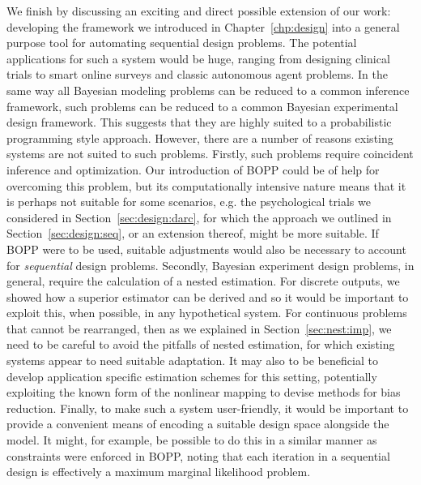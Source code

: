 We finish by discussing an exciting and direct possible extension of our work: developing the framework we introduced 
in Chapter~\ref{chp:design} into a general purpose tool for automating sequential design problems.
The potential applications for such a system would be huge,  ranging from designing clinical trials to
smart online surveys and classic autonomous agent problems.  In  the same way all Bayesian modeling
problems can be reduced to a common inference framework, such problems can be reduced to a
common Bayesian experimental design framework. This suggests that they are highly suited to a
probabilistic programming style approach.  However, there are a number of reasons existing systems
are not suited to such problems.  Firstly, such problems require coincident inference 
and optimization.  Our introduction of BOPP could be of help for overcoming this problem,
but its computationally intensive nature means that it is perhaps not suitable for
some scenarios, e.g. the psychological trials we considered in Section~\ref{sec:design:darc},
for which the approach we outlined in Section~\ref{sec:design:seq}, or an extension thereof,
might be more suitable.  If BOPP were to be used, suitable adjustments would also be necessary
to account for \emph{sequential} design problems.
Secondly, Bayesian experiment design problems, in general, require the calculation of a nested 
estimation.  For discrete outputs, we showed how a superior estimator can be derived and so
it would be important to exploit this, when possible, in any hypothetical system.  For continuous problems that
cannot be rearranged, then as we explained in Section~\ref{sec:nest:imp}, we need to be careful
to avoid the pitfalls of nested estimation, for which existing systems appear to need suitable
adaptation.  It may also to be beneficial to develop application specific estimation schemes
for this setting, potentially exploiting the known form of the nonlinear mapping to
devise methods for bias reduction.  Finally, to make such a system user-friendly, it would
be important to provide a convenient means of encoding a suitable design space alongside the
model.  It might, for example, be possible to do this in a similar manner as constraints were enforced
in BOPP, noting that each iteration in a sequential design is effectively a maximum marginal likelihood
problem.

